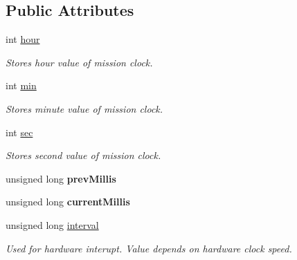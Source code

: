 \subsection*{Public Attributes}
\begin{DoxyCompactItemize}
\item 
int \hyperlink{classClock_a57d40ee919c277b725e2d74644ccd9ce}{hour}\hypertarget{classClock_a57d40ee919c277b725e2d74644ccd9ce}{}\label{classClock_a57d40ee919c277b725e2d74644ccd9ce}

\begin{DoxyCompactList}\small\item\em Stores hour value of mission clock. \end{DoxyCompactList}\item 
int \hyperlink{classClock_a2a3fa6103c69e4984a58394ad6a8eeea}{min}\hypertarget{classClock_a2a3fa6103c69e4984a58394ad6a8eeea}{}\label{classClock_a2a3fa6103c69e4984a58394ad6a8eeea}

\begin{DoxyCompactList}\small\item\em Stores minute value of mission clock. \end{DoxyCompactList}\item 
int \hyperlink{classClock_af7f4eb3293ef61ddcccdf35caced70f1}{sec}\hypertarget{classClock_af7f4eb3293ef61ddcccdf35caced70f1}{}\label{classClock_af7f4eb3293ef61ddcccdf35caced70f1}

\begin{DoxyCompactList}\small\item\em Stores second value of mission clock. \end{DoxyCompactList}\item 
unsigned long {\bfseries prev\+Millis}\hypertarget{classClock_a5cf4adc67bbec82a221f776d8d82f58e}{}\label{classClock_a5cf4adc67bbec82a221f776d8d82f58e}

\item 
unsigned long {\bfseries current\+Millis}\hypertarget{classClock_ab2539928995407922d752e55bd46c6ce}{}\label{classClock_ab2539928995407922d752e55bd46c6ce}

\item 
unsigned long \hyperlink{classClock_a1e040fe2ede6dea4691a79da91fe7139}{interval}\hypertarget{classClock_a1e040fe2ede6dea4691a79da91fe7139}{}\label{classClock_a1e040fe2ede6dea4691a79da91fe7139}

\begin{DoxyCompactList}\small\item\em Used for hardware interupt. Value depends on hardware clock speed. \end{DoxyCompactList}\end{DoxyCompactItemize}


